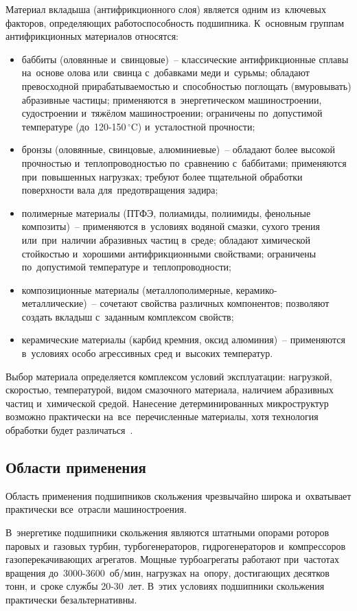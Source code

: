 Материал вкладыша (антифрикционного слоя) является одним из~ключевых факторов, определяющих работоспособность подшипника. К~основным группам антифрикционных материалов относятся:
\begin{itemize}
\item баббиты (оловянные и~свинцовые)~-- классические антифрикционные сплавы на~основе олова или~свинца с~добавками меди и~сурьмы; обладают превосходной прирабатываемостью и~способностью поглощать (вмуровывать) абразивные частицы; применяются в~энергетическом машиностроении, судостроении и~тяжёлом машиностроении; ограничены по~допустимой температуре (до~120-150\,$^{\circ}$C) и~усталостной прочности;
\item бронзы (оловянные, свинцовые, алюминиевые)~-- обладают более высокой прочностью и~теплопроводностью по~сравнению с~баббитами; применяются при~повышенных нагрузках; требуют более тщательной обработки поверхности вала для~предотвращения задира;
\item полимерные материалы (ПТФЭ, полиамиды, полиимиды, фенольные композиты)~-- применяются в~условиях водяной смазки, сухого трения или~при~наличии абразивных частиц в~среде; обладают химической стойкостью и~хорошими антифрикционными свойствами; ограничены по~допустимой температуре и~теплопроводности;
\item композиционные материалы (металлополимерные, керамико-металлические)~-- сочетают свойства различных компонентов; позволяют создать вкладыш с~заданным комплексом свойств;
\item керамические материалы (карбид кремния, оксид алюминия)~-- применяются в~условиях особо агрессивных сред и~высоких температур.
\end{itemize}

Выбор материала определяется комплексом условий эксплуатации: нагрузкой, скоростью, температурой, видом смазочного материала, наличием абразивных частиц и~химической средой. Нанесение детерминированных микроструктур возможно практически на~все~перечисленные материалы, хотя технология обработки будет различаться~\cite{bashmur2023b,petrovsky2020}.

\subsection{Области применения}

Область применения подшипников скольжения чрезвычайно широка и~охватывает практически все~отрасли машиностроения.

В~энергетике подшипники скольжения являются штатными опорами роторов паровых и~газовых турбин, турбогенераторов, гидрогенераторов и~компрессоров газоперекачивающих агрегатов. Мощные турбоагрегаты работают при~частотах вращения до~3000-3600~об/мин, нагрузках на~опору, достигающих десятков тонн, и~сроке службы 20-30~лет. В~этих условиях подшипники скольжения практически безальтернативны.

